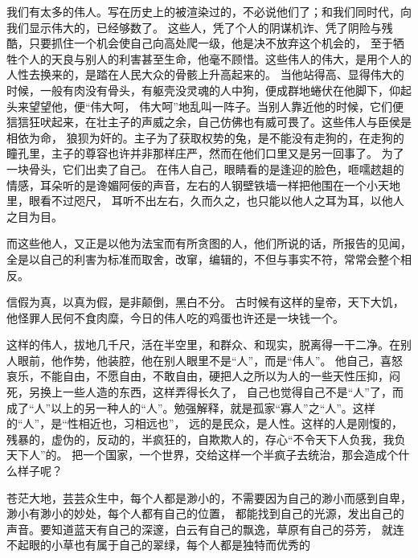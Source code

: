 \documentclass[fontset=windows]{article}
\begin{document}
{
}
\par
\vspace*{4em}
\centerline{}
\begin{multicols}{2}

我们有太多的伟人。写在历史上的被渲染过的，不必说他们了；和我们同时代，向我们显示伟大的，已经够数了。
这些人，凭了个人的阴谋机诈、凭了阴险与残酷，只要抓住一个机会使自己向高处爬一级，他是决不放弃这个机会的，
至于牺牲个人的天良与别人的利害甚至生命，他毫不顾惜。这些伟人的伟大，是用个人的人性去换来的，是踏在人民大众的骨骸上升高起来的。
当他站得高、显得伟大的时候，一般有肉没有骨头，有躯壳没灵魂的人中狗，便成群地蜷伏在他脚下，仰起头来望望他，便“伟大呵，
伟大呵”地乱叫一阵子。当别人靠近他的时候，它们便狺狺狂吠起来，在壮主子的声威之余，自己仿佛也有威可畏了。这些伟人与臣侯是相依为命，
狼狈为奸的。主子为了获取权势的兔，是不能没有走狗的，在走狗的瞳孔里，主子的尊容也许并非那样庄严，然而在他们口里又是另一回事了。
为了一块骨头，它们出卖了自己。
在伟人自己，眼睛看的是逢迎的脸色，咂嚅趑趄的情感，耳朵听的是谗媚阿佞的声音，左右的人钢壁铁墙一样把他围在一个小天地里，眼看不过咫尺，
耳听不出左右，久而久之，也只能以他人之耳为耳，以他人之目为目。
\columnbreak

而这些他人，又正是以他为法宝而有所贪图的人，他们所说的话，所报告的见闻，
全是以自己的利害为标准而取舍，改窜，编辑的，不但与事实不符，常常会整个相反。

信假为真，以真为假，是非颠倒，黑白不分。
古时候有这样的皇帝，天下大饥，他怪罪人民何不食肉糜，今日的伟人吃的鸡蛋也许还是一块钱一个。

这样的伟人，拔地几千尺，活在半空里，和群众、和现实，脱离得一干二净。在别人眼前，他作势，他装腔，他在别人眼里不是“人”，而是“伟人”。
他自己，喜怒哀乐，不能自由，不愿自由，不敢自由，硬把人之所以为人的一些天性压抑，闷死，另换上一些人造的东西，这样弄得长久了，
自己也觉得自己不是“人”了，而成了“人”以上的另一种人的“人”。勉强解释，就是孤家“寡人”之“人”。这样的“人”，是“性相近也，习相远也”，
远的是民众，是人性。这样的人是刚愎的，残暴的，虚伪的，反动的，半疯狂的，自欺欺人的，存心“不令天下人负我，我负天下人”的。
把一个国家，一个世界，交给这样一个半疯子去统治，那会造成个什么样子呢？

\end{multicols}
\par
{
    \kaishu 
    苍茫大地，芸芸众生中，每个人都是渺小的，不需要因为自己的渺小而感到自卑，渺小有渺小的妙处，每个人都有自己的位置，
    都能找到自己的光源，发出自己的声音。要知道蓝天有自己的深邃，白云有自己的飘逸，草原有自己的芬芳，
    就连不起眼的小草也有属于自己的翠绿，每个人都是独特而优秀的
}
\end{document}
